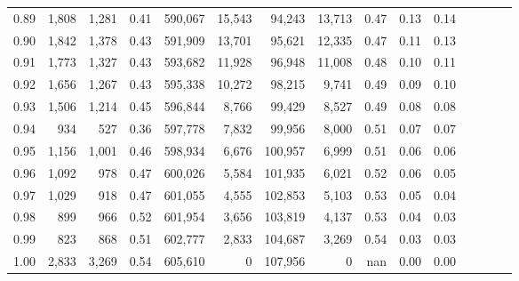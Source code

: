 \begin{tabular}{rrrcrrrrrrrrrrr}
0.89 &   1,808 &  1,281 &                                       0.41 &  590,067 &   15,543 &   94,243 &   13,713 &  0.47 &  0.13 &                         0.14 \\
0.90 &   1,842 &  1,378 &                                       0.43 &  591,909 &   13,701 &   95,621 &   12,335 &  0.47 &  0.11 &                         0.13 \\
0.91 &   1,773 &  1,327 &                                       0.43 &  593,682 &   11,928 &   96,948 &   11,008 &  0.48 &  0.10 &                         0.11 \\
0.92 &   1,656 &  1,267 &                                       0.43 &  595,338 &   10,272 &   98,215 &    9,741 &  0.49 &  0.09 &                         0.10 \\
0.93 &   1,506 &  1,214 &                                       0.45 &  596,844 &    8,766 &   99,429 &    8,527 &  0.49 &  0.08 &                         0.08 \\
0.94 &     934 &    527 &                                       0.36 &  597,778 &    7,832 &   99,956 &    8,000 &  0.51 &  0.07 &                         0.07 \\
0.95 &   1,156 &  1,001 &                                       0.46 &  598,934 &    6,676 &  100,957 &    6,999 &  0.51 &  0.06 &                         0.06 \\
0.96 &   1,092 &    978 &                                       0.47 &  600,026 &    5,584 &  101,935 &    6,021 &  0.52 &  0.06 &                         0.05 \\
0.97 &   1,029 &    918 &                                       0.47 &  601,055 &    4,555 &  102,853 &    5,103 &  0.53 &  0.05 &                         0.04 \\
0.98 &     899 &    966 &                                       0.52 &  601,954 &    3,656 &  103,819 &    4,137 &  0.53 &  0.04 &                         0.03 \\
0.99 &     823 &    868 &                                       0.51 &  602,777 &    2,833 &  104,687 &    3,269 &  0.54 &  0.03 &                         0.03 \\
1.00 &   2,833 &  3,269 &                                       0.54 &  605,610 &        0 &  107,956 &        0 &   nan &  0.00 &                         0.00 \\
\bottomrule
\end{tabular}
